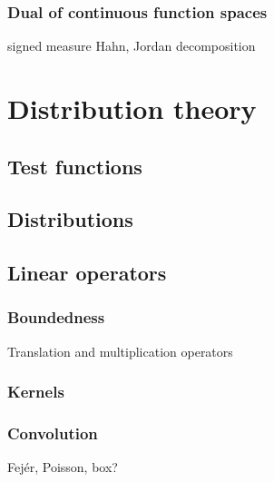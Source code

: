 \documentclass{../../large}
\begin{document}
\section{Dual of continuous function spaces}

signed measure
Hahn, Jordan decomposition







\part{Distribution theory}
\chapter{Test functions}


\chapter{Distributions}


\chapter{Linear operators}

\section{Boundedness}

Translation and multiplication operators

\begin{prb}
\end{prb}


\section{Kernels}
\begin{prb}
\end{prb}
\begin{prb}
\end{prb}

\section{Convolution}
\begin{prb}
Fej\'er, Poisson, box?
\end{prb}
\begin{prb}
\end{prb}
\end{document}
